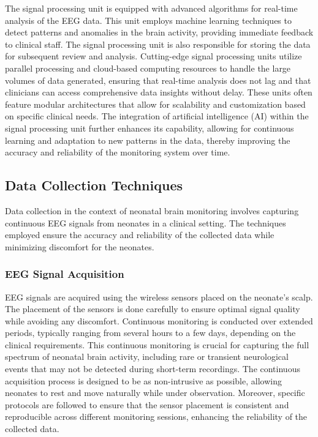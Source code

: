 \documentclass[12pt,journal,compsoc]{IEEEtran}
\begin{document}
The signal processing unit is equipped with advanced algorithms for real-time analysis of the EEG data. This unit employs machine learning techniques to detect patterns and anomalies in the brain activity, providing immediate feedback to clinical staff. The signal processing unit is also responsible for storing the data for subsequent review and analysis. Cutting-edge signal processing units utilize parallel processing and cloud-based computing resources to handle the large volumes of data generated, ensuring that real-time analysis does not lag and that clinicians can access comprehensive data insights without delay. These units often feature modular architectures that allow for scalability and customization based on specific clinical needs. The integration of artificial intelligence (AI) within the signal processing unit further enhances its capability, allowing for continuous learning and adaptation to new patterns in the data, thereby improving the accuracy and reliability of the monitoring system over time.

\subsection{Data Collection Techniques}

Data collection in the context of neonatal brain monitoring involves capturing continuous EEG signals from neonates in a clinical setting. The techniques employed ensure the accuracy and reliability of the collected data while minimizing discomfort for the neonates.

\subsubsection{EEG Signal Acquisition}

EEG signals are acquired using the wireless sensors placed on the neonate’s scalp. The placement of the sensors is done carefully to ensure optimal signal quality while avoiding any discomfort. Continuous monitoring is conducted over extended periods, typically ranging from several hours to a few days, depending on the clinical requirements. This continuous monitoring is crucial for capturing the full spectrum of neonatal brain activity, including rare or transient neurological events that may not be detected during short-term recordings. The continuous acquisition process is designed to be as non-intrusive as possible, allowing neonates to rest and move naturally while under observation. Moreover, specific protocols are followed to ensure that the sensor placement is consistent and reproducible across different monitoring sessions, enhancing the reliability of the collected data.
\end{document}
